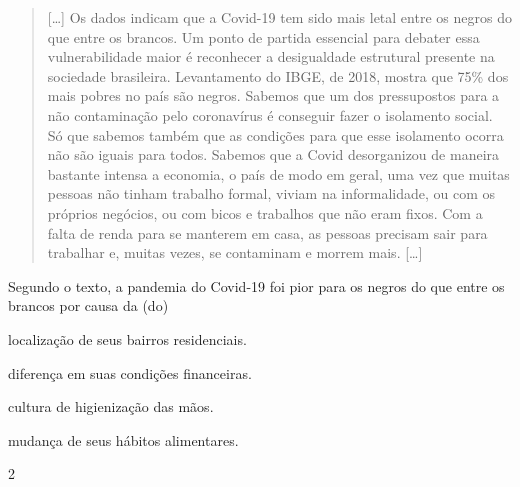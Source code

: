 \begin{quote}
{[}\ldots{}{]} Os dados indicam que a Covid-19 tem sido mais letal entre os negros
do que entre os brancos. Um ponto de partida essencial para debater essa
vulnerabilidade maior é reconhecer a desigualdade estrutural presente na
sociedade brasileira. Levantamento do IBGE, de 2018, mostra que 75\% dos
mais pobres no país são negros. Sabemos que um dos pressupostos para a
não contaminação pelo coronavírus é conseguir fazer o isolamento social.
Só que sabemos também que as condições para que esse isolamento ocorra
não são iguais para todos. Sabemos que a Covid desorganizou de maneira
bastante intensa a economia, o país de modo em geral, uma vez que muitas
pessoas não tinham trabalho formal, viviam na informalidade, ou com os
próprios negócios, ou com bicos e trabalhos que não eram fixos. Com a
falta de renda para se manterem em casa, as pessoas precisam sair para
trabalhar e, muitas vezes, se contaminam e morrem mais. {[}\ldots{}{]} 

\end{quote}

Segundo o texto, a pandemia do Covid-19 foi pior para os negros do que
entre os brancos por causa da (do)

\begin{escolha}
\item localização de seus bairros residenciais.

\item diferença em suas condições financeiras.

\item cultura de higienização das mãos.

\item mudança de seus hábitos alimentares.
\end{escolha}


\num{2}

